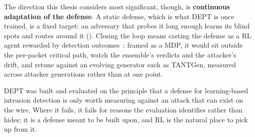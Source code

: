 The direction this thesis considers most significant, though, is \textbf{continuous adaptation of
the defense}. A static defense, which is what DEPT is once trained, is a fixed target: an
adversary that probes it long enough learns its blind spots and routes around it
(). Closing the loop means casting the defense as a \ac{RL} agent rewarded by
detection outcomes~\cite{sutton2018reinforcement,nguyen2021deep,caminero2019adversarial}: framed
as a \ac{MDP}, it would sit outside the per-packet critical path, watch the ensemble's verdicts
and the attacker's drift, and retune against an evolving generator such as TANTGen, measured
across attacker generations rather than at one point.

DEPT was built and evaluated on the principle that a defense for learning-based intrusion
detection is only worth measuring against an attack that can exist on the wire. Where it fails, it
fails for reasons the evaluation identifies rather than hides; it is a defense meant to be built
upon, and \ac{RL} is the natural place to pick up from it.
